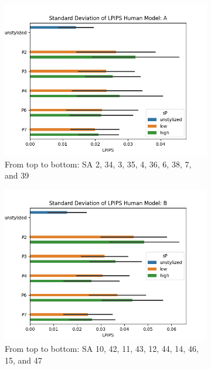 \begin{figure}[ht]
	\centering
	\begin{subfigure}{0.49\textwidth}
		\includegraphics[width=\linewidth]{Figures/results/good/sd_lpips_dora.png}
		\caption{From top to bottom: SA 2, 34, 3, 35, 4, 36, 6, 38, 7, and 39}
	\end{subfigure}
	\begin{subfigure}{0.49\textwidth}
		\includegraphics[width=\linewidth]{Figures/results/good/sd_lpips_ephra.png}
		\caption{From top to bottom: SA 10, 42, 11, 43, 12, 44, 14, 46, 15, and 47}
	\end{subfigure}
	\begin{subfigure}{0.49\textwidth}

\end{subfigure}
\end{figure}

